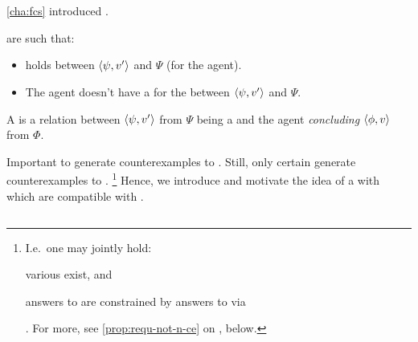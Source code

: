 \chapter{}
\label{cha:requs}

\begin{note}
  \autoref{cha:fcs} introduced .

   are such that:
  \begin{itemize}
  \item
    \ros{} holds between \(\langle \psi, v' \rangle\) and \(\Psi\) (for the agent).
  \item
    The agent doesn't have a \wit{} for the \ros{} between \(\langle \psi, v' \rangle\) and \(\Psi\).
  \end{itemize}

  A \requ{} is a relation between \(\langle \psi, v' \rangle\) from \(\Psi\) being a \fc{} and the agent \emph{concluding} \(\langle \phi, v \rangle\) from \(\Phi\).
\end{note}

\begin{note}
  Important to generate counterexamples to \issueConstraint{}.
  Still, only certain  generate counterexamples to \issueConstraint{}.%
  \footnote{
    I.e.\ one may jointly hold:
    \begin{enumerate*}[label=(\alph*)]
    \item
      various  exist, and
    \item
      answers to \qWhyV{} are constrained by answers to \qHowV{} via \issueConstraint{}
    \end{enumerate*}%
    .
    For more, see \autoref{prop:requ-not-n-ce} on , below.
  }
  Hence, we introduce and motivate the idea of a  with  which are compatible with \issueConstraint{}.
\end{note}

\section{}
\label{cha:requs:requs}

